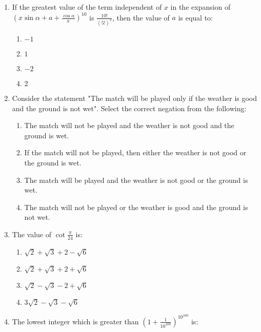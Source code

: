 \documentclass[journal]{IEEEtran}
\newcommand{\brak}[1]{\left( #1 \right)}
\begin{document}
\begin{enumerate}
    \item If the greatest value of the term independent of $x$ in the expansion of $\brak{x\sin\alpha+a+\frac{\cos\alpha}{x}}^{10}$ is $\frac{10!}{\brak{5!}^2}$, then the value of $a$ is equal to:
    
        \begin{multicols}{4}
        \begin{enumerate}
        \item $-1$
        \item $1$
        \item $-2$
        \item $2$
        \end{enumerate}
        \end{multicols}

    \item Consider the statement "The match will be played only if the weather is good and the ground is not wet". Select the correct negation from the following:
    
   
        \begin{enumerate}
        \item The match will not be played and the weather is not good and the ground is wet.
        \item If the match will not be played, then either the weather is not good or the ground is wet.
        \item The match will be played and the weather is not good or the ground is wet.
        \item The match will not be played or the weather is good and the ground is not wet.
        \end{enumerate}
        

    \item The value of $\cot\frac{\pi}{24}$ is:
        
        \begin{enumerate}
        \item $\sqrt{2}+\sqrt{3}+2-\sqrt{6}$
        \item $\sqrt{2}+\sqrt{3}+2+\sqrt{6}$
        \item $\sqrt{2}-\sqrt{3}-2+\sqrt{6}$
        \item $3\sqrt{2}-\sqrt{3}-\sqrt{6}$
        \end{enumerate}
        
    \item The lowest integer which is greater than $\brak{1+\frac{1}{10^{100}}}^{10^{100}}$ is:


\end{enumerate}
\end{document}

